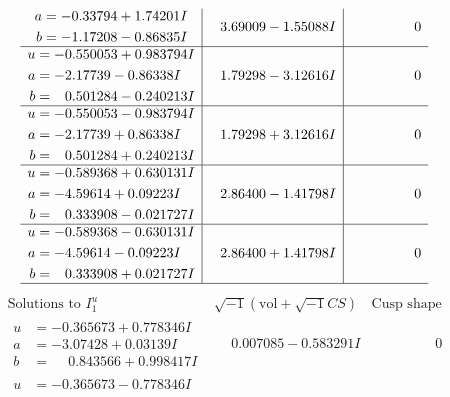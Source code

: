 \documentclass[1p]{elsarticle_modified}
\theoremstyle{definition}
\newcommand{\I}{\sqrt{-1}}
\begin{document}
$$\begin{array}{c|c|c}
\begin{aligned}
a &= -0.33794 + 1.74201 I \\
b &= -1.17208 - 0.86835 I\end{aligned}
 & \phantom{-}3.69009 - 1.55088 I & \phantom{-0.000000 } 0 \\ \hline\begin{aligned}
u &= -0.550053 + 0.983794 I \\
a &= -2.17739 - 0.86338 I \\
b &= \phantom{-}0.501284 - 0.240213 I\end{aligned}
 & \phantom{-}1.79298 - 3.12616 I & \phantom{-0.000000 } 0 \\ \hline\begin{aligned}
u &= -0.550053 - 0.983794 I \\
a &= -2.17739 + 0.86338 I \\
b &= \phantom{-}0.501284 + 0.240213 I\end{aligned}
 & \phantom{-}1.79298 + 3.12616 I & \phantom{-0.000000 } 0 \\ \hline\begin{aligned}
u &= -0.589368 + 0.630131 I \\
a &= -4.59614 + 0.09223 I \\
b &= \phantom{-}0.333908 - 0.021727 I\end{aligned}
 & \phantom{-}2.86400 - 1.41798 I & \phantom{-0.000000 } 0 \\ \hline\begin{aligned}
u &= -0.589368 - 0.630131 I \\
a &= -4.59614 - 0.09223 I \\
b &= \phantom{-}0.333908 + 0.021727 I\end{aligned}
 & \phantom{-}2.86400 + 1.41798 I & \phantom{-0.000000 } 0\\
 \hline 
 \end{array}$$\newpage$$\begin{array}{c|c|c}  
\text{Solutions to }I^u_{1}& \I (\text{vol} + \sqrt{-1}CS) & \text{Cusp shape}\\
 \hline 
\begin{aligned}
u &= -0.365673 + 0.778346 I \\
a &= -3.07428 + 0.03139 I \\
b &= \phantom{-}0.843566 + 0.998417 I\end{aligned}
 & \phantom{-}0.007085 - 0.583291 I & \phantom{-0.000000 } 0 \\ \hline\begin{aligned}
u &= -0.365673 - 0.778346 I \\

\end{aligned}
\end{array}$$
\end{document}
